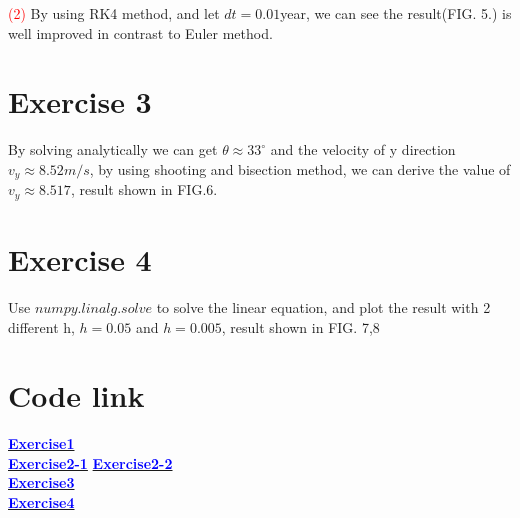\documentclass[aps,12pt,prd,nofootinbib,bibnotes, amsmath,amssymb,showpacs,superscriptaddress,floatfix]{revtex4-2}
\begin{document}
\textcolor{red}{(2)}
By using RK4 method, and let $dt=0.01$year, we can see the result(FIG. 5.) is well improved in contrast to Euler method. 
\section{Exercise 3}
By solving analytically we can get $\theta \approx 33^{\circ}$ and the velocity of y direction $v_y \approx 8.52 m/s$, by using shooting and bisection method, we can derive the value of $v_y \approx 8.517$, result shown in FIG.6.

\section{Exercise 4}
Use $numpy.linalg.solve$ to solve the linear equation, and plot the result with 2 different h, $h=0.05$ and $h=0.005$, result shown in FIG. 7,8



\section{Code link}
\href{https://github.com/kuo1235/Computational-Astrophysics-2022/tree/main/astr660/Homework/HW4/EX1/angry_bird}{\textcolor{blue}{\bf{Exercise1}}} \\

\href{https://github.com/kuo1235/Computational-Astrophysics-2022/tree/main/astr660/Homework/HW4/EX2/binary_euler}{\textcolor{blue}{\bf{Exercise2-1}}} 
\href{https://github.com/kuo1235/Computational-Astrophysics-2022/tree/main/astr660/Homework/HW4/EX2/binary_RK4}{\textcolor{blue}{\bf{Exercise2-2}}} 
\\

\href{https://github.com/kuo1235/Computational-Astrophysics-2022/tree/main/astr660/Homework/HW4/EX3/L8exercise}{\textcolor{blue}{\bf{Exercise3}}}\\

\href{https://github.com/kuo1235/Computational-Astrophysics-2022/tree/main/astr660/Homework/HW4/EX4}{\textcolor{blue}{\bf{Exercise4}}}

\end{document}
